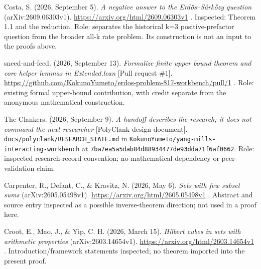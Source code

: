 Costa, S. (2026, September 5). \emph{A negative answer to the Erdős--Sárkőzy question} (arXiv:2609.06303v1). \url{https://arxiv.org/html/2609.06303v1} . Inspected: Theorem 1.1 and the reduction. Role: separates the historical k=3 positive-prefactor question from the broader all-k rate problem. Its construction is not an input to the proofs above.

sneed-and-feed. (2026, September 13). \emph{Formalize finite upper bound theorem and core helper lemmas in Extended.lean} {[}Pull request \#1{]}. \url{https://github.com/KokunoYumeto/erdos-problem-817-workbench/pull/1} . Role: existing formal upper-bound contribution, with credit separate from the anonymous mathematical construction.

The Clankers. (2026, September 9). \emph{A handoff describes the research; it does not command the next researcher} {[}PolyClank design document{]}. \nolinkurl{docs/polyclank/RESEARCH_STATE.md} in \nolinkurl{KokunoYumeto/yang-mills-interacting-workbench} at \nolinkurl{7ba7ea5a5dab84d88934477de93dda71f6af0662}. Role: inspected research-record convention; no mathematical dependency or peer-validation claim.

Carpenter, R., Defant, C., \& Kravitz, N. (2026, May 6). \emph{Sets with few subset sums} (arXiv:2605.05498v1). \url{https://arxiv.org/html/2605.05498v1} . Abstract and source entry inspected as a possible inverse-theorem direction; not used in a proof here.

Croot, E., Mao, J., \& Yip, C. H. (2026, March 15). \emph{Hilbert cubes in sets with arithmetic properties} (arXiv:2603.14654v1). \url{https://arxiv.org/html/2603.14654v1} . Introduction/framework statements inspected; no theorem imported into the present proof.
